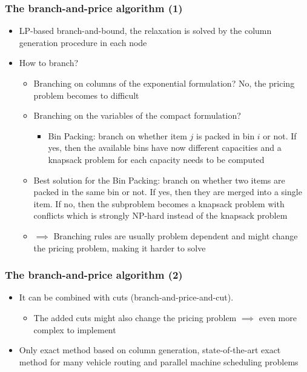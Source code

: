 \documentclass[10pt]{beamer}
\begin{document}
\begin{frame}
  \frametitle{The branch-and-price algorithm (1)}
  
  \begin{itemize}
    \item LP-based branch-and-bound, the relaxation is solved by the column generation procedure in each node
    \item How to branch?
      \begin{itemize}
        \item Branching on columns of the exponential formulation? No, the pricing problem becomes to difficult
          \item Branching on the variables of the compact formulation?
            \begin{itemize}
              \item Bin Packing: branch on whether item $j$ is packed in bin $i$ or not. If yes, then the available bins have now different capacities and a knapsack problem for each capacity needs to be computed
            \end{itemize}
          \item Best solution for the Bin Packing: branch on whether two items are packed in the same bin or not. If yes, then they are merged into a single item. If no, then the subproblem becomes a knapsack problem with conflicts which is strongly NP-hard instead of the knapsack problem
          \item $\implies$ Branching rules are usually problem dependent and might change the pricing problem, making it harder to solve
      \end{itemize}
  \end{itemize}
\end{frame}

\begin{frame}
  \frametitle{The branch-and-price algorithm (2)}
  \begin{itemize}
      \item It can be combined with cuts (branch-and-price-and-cut).
        \begin{itemize}
          \item The added cuts might also change the pricing problem $\implies$ even more complex to implement
        \end{itemize}
      \item Only exact method based on column generation, state-of-the-art exact method for many vehicle routing and parallel machine scheduling problems
  \end{itemize}
\end{frame}
\end{document}
